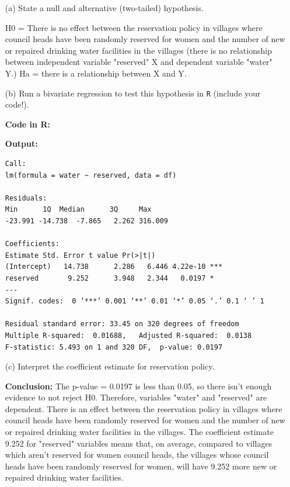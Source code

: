 \documentclass[12pt,letterpaper]{article}
\begin{document}
\newpage
\begin{enumerate}
	\item [(a)] State a null and alternative (two-tailed) hypothesis. 
	
	\vspace{0.5cm}
	
	\noindent H0 = There is no effect between the reservation policy in villages where council heads have been randomly reserved for women and the number of new or repaired drinking water facilities in the villages (there is no relationship between independent variable "reserved" X and dependent variable "water" Y.)
	Ha = there is a relationship between X and Y.
	
	\item [(b)] Run a bivariate regression to test this hypothesis in \texttt{R} (include your code!).
	\vspace{0.5cm}
	
	\noindent \textbf{Code in R:}
	  
	\vspace{.25cm}
	
	\noindent \textbf{Output: }
	\begin{verbatim}
Call:
lm(formula = water ~ reserved, data = df)

Residuals:
Min      1Q  Median      3Q     Max 
-23.991 -14.738  -7.865   2.262 316.009 

Coefficients:
Estimate Std. Error t value Pr(>|t|)    
(Intercept)   14.738      2.286   6.446 4.22e-10 ***
reserved       9.252      3.948   2.344   0.0197 *  
---
Signif. codes:  0 ‘***’ 0.001 ‘**’ 0.01 ‘*’ 0.05 ‘.’ 0.1 ‘ ’ 1

Residual standard error: 33.45 on 320 degrees of freedom
Multiple R-squared:  0.01688,	Adjusted R-squared:  0.0138 
F-statistic: 5.493 on 1 and 320 DF,  p-value: 0.0197

	\end{verbatim}  
	\vspace{.25cm} 
	
	\item [(c)] Interpret the coefficient estimate for reservation policy. 

	\noindent \textbf{Conclusion:} The p-value = 0.0197 is less than 0.05, so there isn't enough evidence to not reject H0. Therefore, variables "water" and "reserved" are dependent. There is an effect between the reservation policy in villages where council heads have been randomly reserved for women and the number of new or repaired drinking water facilities in the villages. The coefficient estimate 9.252 for "reserved" variables means that, on average, compared to villages which aren't reserved for women council heads, the villages whose council heads have been randomly reserved for women, will have 9.252 more new or repaired drinking water facilities.
	
\end{enumerate}
\end{document}

